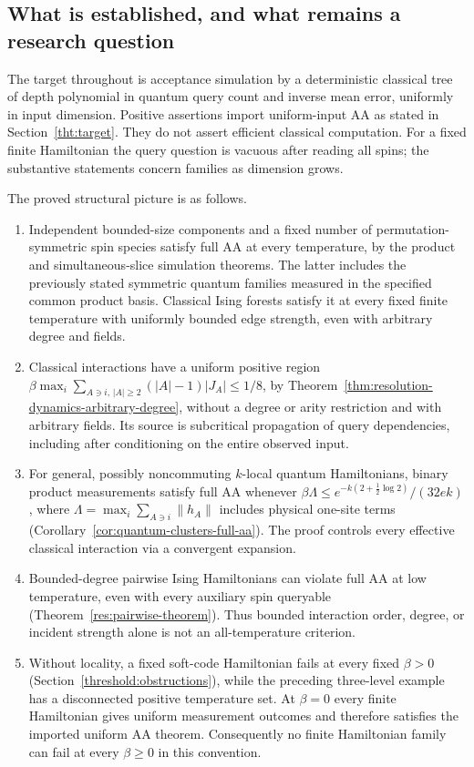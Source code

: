 \subsection{What is established, and what remains a research question}
\label{sec:resolution-status}

The target throughout is acceptance simulation by a deterministic
classical tree of depth polynomial in quantum query count and inverse
mean error, uniformly in input dimension. Positive assertions import
uniform-input AA as stated in Section~\ref{tht:target}. They do not
assert efficient classical computation. For a fixed finite Hamiltonian
the query question is vacuous after reading all spins; the substantive
statements concern families as dimension grows.

The proved structural picture is as follows.
\begin{enumerate}
\item Independent bounded-size components and a fixed number of
permutation-symmetric spin species satisfy full AA at every
temperature, by the product and simultaneous-slice simulation
theorems. The latter includes the previously stated symmetric quantum
families measured in the specified common product basis. Classical
Ising forests satisfy it at every fixed finite temperature with
uniformly bounded edge strength, even with arbitrary degree and fields.
\item Classical interactions have a uniform positive region
$\beta\max_i\sum_{A\ni i,\,|A|\ge2}(|A|-1)|J_A|\le1/8$,
by Theorem~\ref{thm:resolution-dynamics-arbitrary-degree}, without
a degree or arity restriction and with arbitrary fields. Its source is
subcritical propagation of query dependencies, including after
conditioning on the entire observed input.
\item For general, possibly noncommuting $k$-local quantum Hamiltonians,
binary product measurements satisfy full AA whenever
$\beta\Lambda\le e^{-k(2+\frac12\log2)}/(32ek)$, where
$\Lambda=\max_i\sum_{A\ni i}\|h_A\|$ includes physical one-site
terms (Corollary~\ref{cor:quantum-clusters-full-aa}). The proof controls
every effective classical interaction via a convergent expansion.
\item Bounded-degree pairwise Ising Hamiltonians can violate full AA
at low temperature, even with every auxiliary spin queryable
(Theorem~\ref{res:pairwise-theorem}). Thus bounded interaction order,
degree, or incident strength alone is not an all-temperature criterion.
\item Without locality, a fixed soft-code Hamiltonian fails at every
fixed $\beta>0$ (Section~\ref{threshold:obstructions}), while
the preceding three-level example has a disconnected positive
temperature set. At $\beta=0$ every finite Hamiltonian gives uniform
measurement outcomes and therefore satisfies the imported uniform AA
theorem. Consequently no finite Hamiltonian family can fail at every
$\beta\ge0$ in this convention.
\end{enumerate}

